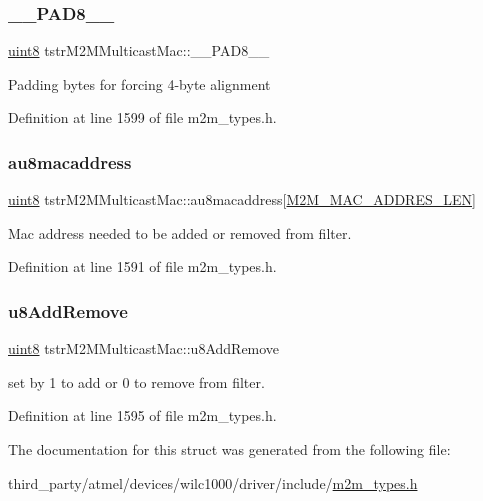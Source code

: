 \subsubsection{\texorpdfstring{\+\_\+\+\_\+\+P\+A\+D8\+\_\+\+\_\+}{\_\_PAD8\_\_}}
{\footnotesize\ttfamily \hyperlink{group__DataT_ga4df709a77647e870bbf1d955b8edc9a6}{uint8} tstr\+M2\+M\+Multicast\+Mac\+::\+\_\+\+\_\+\+P\+A\+D8\+\_\+\+\_\+}

Padding bytes for forcing 4-\/byte alignment 

Definition at line 1599 of file m2m\+\_\+types.\+h.

\mbox{\label{structtstrM2MMulticastMac_a2900231a97d20539732b89c067a8c326}} 
\subsubsection{\texorpdfstring{au8macaddress}{au8macaddress}}
{\footnotesize\ttfamily \hyperlink{group__DataT_ga4df709a77647e870bbf1d955b8edc9a6}{uint8} tstr\+M2\+M\+Multicast\+Mac\+::au8macaddress\mbox{[}\hyperlink{group__WlanDefines_ga6884f9d5fed2dd058a1bbf4358b5c263}{M2\+M\+\_\+\+M\+A\+C\+\_\+\+A\+D\+D\+R\+E\+S\+\_\+\+L\+EN}\mbox{]}}

Mac address needed to be added or removed from filter. 

Definition at line 1591 of file m2m\+\_\+types.\+h.

\mbox{\label{structtstrM2MMulticastMac_ad6ef3a36899b8c5d8c1a9bb0f023aa5c}} 
\subsubsection{\texorpdfstring{u8\+Add\+Remove}{u8AddRemove}}
{\footnotesize\ttfamily \hyperlink{group__DataT_ga4df709a77647e870bbf1d955b8edc9a6}{uint8} tstr\+M2\+M\+Multicast\+Mac\+::u8\+Add\+Remove}

set by 1 to add or 0 to remove from filter. 

Definition at line 1595 of file m2m\+\_\+types.\+h.



The documentation for this struct was generated from the following file\+:\begin{DoxyCompactItemize}
\item 
third\+\_\+party/atmel/devices/wilc1000/driver/include/\hyperlink{m2m__types_8h}{m2m\+\_\+types.\+h}\end{DoxyCompactItemize}
